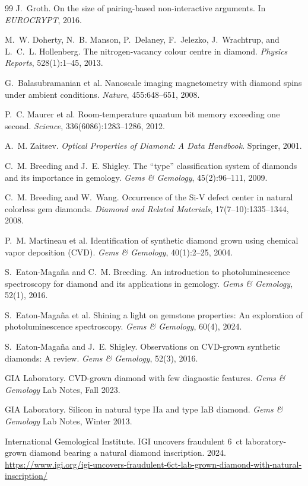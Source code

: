 \documentclass[10pt,twocolumn]{article}
\theoremstyle{remark}
\begin{document}
\begin{thebibliography}{99}
 J.~Groth. On the size of pairing-based non-interactive
arguments. In \emph{EUROCRYPT}, 2016.

 M.~W. Doherty, N.~B. Manson, P.~Delaney, F.~Jelezko,
J.~Wrachtrup, and L.~C.~L. Hollenberg. The nitrogen-vacancy colour centre in
diamond. \emph{Physics Reports}, 528(1):1--45, 2013.

 G.~Balasubramanian et al. Nanoscale imaging
magnetometry with diamond spins under ambient conditions. \emph{Nature},
455:648--651, 2008.

 P.~C. Maurer et al. Room-temperature quantum bit memory
exceeding one second. \emph{Science}, 336(6086):1283--1286, 2012.

 A.~M. Zaitsev. \emph{Optical Properties of Diamond: A Data
Handbook}. Springer, 2001.

 C.~M. Breeding and J.~E. Shigley. The ``type''
classification system of diamonds and its importance in gemology. \emph{Gems \&
Gemology}, 45(2):96--111, 2009.

 C.~M. Breeding and W.~Wang. Occurrence of the Si-V defect
center in natural colorless gem diamonds. \emph{Diamond and Related Materials},
17(7--10):1335--1344, 2008.

 P.~M. Martineau et al. Identification of synthetic
diamond grown using chemical vapor deposition (CVD). \emph{Gems \& Gemology},
40(1):2--25, 2004.

 S.~Eaton-Maga\~na and C.~M. Breeding. An introduction to
photoluminescence spectroscopy for diamond and its applications in gemology.
\emph{Gems \& Gemology}, 52(1), 2016.

 S.~Eaton-Maga\~na et al. Shining a light on gemstone
properties: An exploration of photoluminescence spectroscopy. \emph{Gems \&
Gemology}, 60(4), 2024.

 S.~Eaton-Maga\~na and J.~E. Shigley. Observations on
CVD-grown synthetic diamonds: A review. \emph{Gems \& Gemology}, 52(3), 2016.

 GIA Laboratory. CVD-grown diamond with few diagnostic
features. \emph{Gems \& Gemology} Lab Notes, Fall 2023.

 GIA Laboratory. Silicon in natural type IIa and type IaB
diamond. \emph{Gems \& Gemology} Lab Notes, Winter 2013.

 International Gemological Institute. IGI uncovers fraudulent
6~ct laboratory-grown diamond bearing a natural diamond inscription. 2024.
\url{https://www.igi.org/igi-uncovers-fraudulent-6ct-lab-grown-diamond-with-natural-inscription/}


\end{thebibliography}
\end{document}
